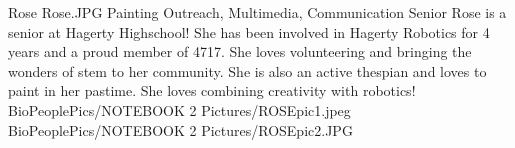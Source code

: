 \insertbio
{Rose}
{Rose.JPG}
{Painting}
{Outreach, Multimedia, Communication}
{Senior}
{
Rose is a senior at Hagerty Highschool! She has been involved in Hagerty Robotics for 4 years and a proud member of 4717. She loves volunteering and bringing the wonders of stem to her community. She is also an active thespian and loves to paint in her pastime. She loves combining creativity with robotics!
}
{BioPeoplePics/NOTEBOOK 2 Pictures/ROSEpic1.jpeg}
{BioPeoplePics/NOTEBOOK 2 Pictures/ROSEpic2.JPG}